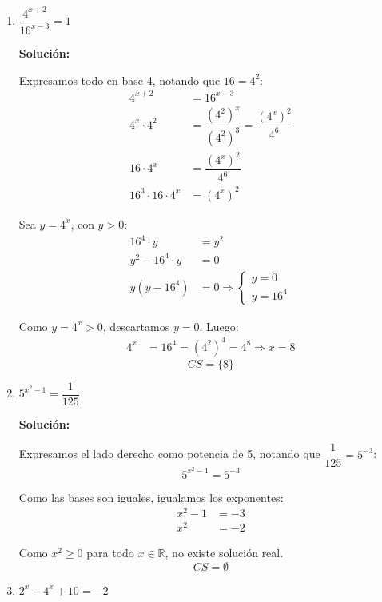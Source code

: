 \documentclass[12pt]{article}
\newcommand{\solucion}{%
    \vspace{0.8em}%
    \textbf{Solución:}%
}
\begin{document}
\begin{enumerate}[label=\alph*.-]

    \item $\dfrac{4^{x+2}}{16^{x-3}} = 1$

    \solucion

    Expresamos todo en base 4, notando que $16 = 4^2$:
    \begin{align*}
    4^{x+2} &= 16^{x-3} \\[0.3em]
    4^x \cdot 4^2 &= \dfrac{(4^2)^x}{(4^2)^3} = \dfrac{(4^x)^2}{4^6}\\[0.3em]
    16 \cdot 4^x &= \dfrac{(4^x)^2}{4^6} \\[0.3em]
    16^3 \cdot 16 \cdot 4^x &= (4^x)^2
    \end{align*}

    Sea $y = 4^x$, con $y > 0$:
    \begin{align*}
    16^4 \cdot y &= y^2 \\[0.3em]
    y^2 - 16^4 \cdot y &= 0 \\[0.3em]
    y(y - 16^4) &= 0 \Rightarrow
    \begin{cases} y = 0 \\ y = 16^4 \end{cases}
    \end{align*}

    Como $y = 4^x > 0$, descartamos $y = 0$. Luego:
    \begin{align*}
    4^x &= 16^4 = (4^2)^4 = 4^8 \Rightarrow x = 8
    \end{align*}
    \[
    \boxed{CS = \{8\}}
    \]

    \newpage
    \item $5^{x^2 - 1} = \dfrac{1}{125}$

    \solucion

    Expresamos el lado derecho como potencia de 5, notando que $\dfrac{1}{125} = 5^{-3}$:
    \[
    5^{x^2 - 1} = 5^{-3}
    \]

    Como las bases son iguales, igualamos los exponentes:
    \begin{align*}
    x^2 - 1 &= -3 \\[0.3em]
    x^2 &= -2
    \end{align*}

    Como $x^2 \geq 0$ para todo $x \in \mathbb{R}$, no existe solución real.
    \[
    \boxed{CS = \emptyset}
    \]

    \item $2^x - 4^x + 10 = -2$


\end{enumerate}
\end{document}
